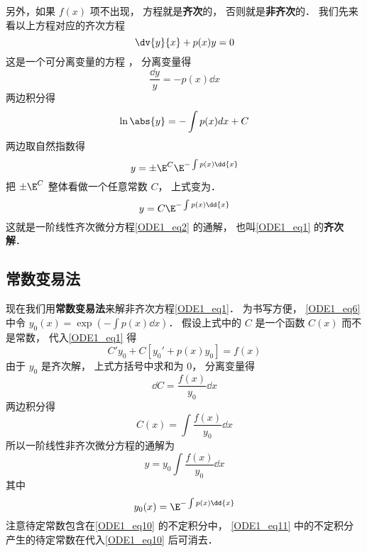  另外，如果 $f(x)$ 项不出现， 方程就是\textbf{齐次}的， 否则就是\textbf{非齐次}的． 我们先来看以上方程对应的齐次方程
\begin{equation}\label{ODE1_eq2}
\dv{y}{x} + p(x)y = 0
\end{equation}
这是一个可分离变量的方程%
， 分离变量得
\begin{equation}
\frac{\dd{y}}{y} = -p(x) \dd{x}
\end{equation}
两边积分得
\begin{equation}
\ln\abs{y} = -\int p(x) dx + C
\end{equation}
两边取自然指数得
\begin{equation}
y = \pm \E^C \E^{-\int p(x) \dd{x}}
\end{equation}
把 $\pm \E^C $ 整体看做一个任意常数 $C$， 上式变为．
\begin{equation}\label{ODE1_eq6}
y = C \E^{-\int p(x) \dd{x}}
\end{equation}
这就是一阶线性齐次微分方程\autoref{ODE1_eq2} 的通解， 也叫\autoref{ODE1_eq1} 的\textbf{齐次解}．

\subsection{常数变易法}

现在我们用\textbf{常数变易法}来解非齐次方程\autoref{ODE1_eq1}． 为书写方便， \autoref{ODE1_eq6} 中令 $y_0(x) = \exp(-\int p(x) \dd{x})$． 假设上式中的 $C$ 是一个函数 $C(x)$ 而不是常数， 代入\autoref{ODE1_eq1} 得
\begin{equation}
C'y_0 + C[y_0' + p(x)y_0] = f(x)
\end{equation}
由于 $y_0$ 是齐次解， 上式方括号中求和为 0， 分离变量得
\begin{equation}
\dd{C}= \frac{f(x)}{y_0} \dd{x}
\end{equation}
两边积分得
\begin{equation}
C(x) = \int \frac{f(x)}{y_0} \dd{x}
\end{equation}
所以一阶线性非齐次微分方程的通解为
\begin{equation}\label{ODE1_eq10}
y = y_0  \int \frac{f(x)}{y_0} \dd{x}
\end{equation}
其中
\begin{equation}\label{ODE1_eq11}
y_0(x) = \E^{-\int p(x) \dd{x}}
\end{equation}
注意待定常数包含在\autoref{ODE1_eq10} 的不定积分中， \autoref{ODE1_eq11} 中的不定积分产生的待定常数在代入\autoref{ODE1_eq10} 后可消去．
